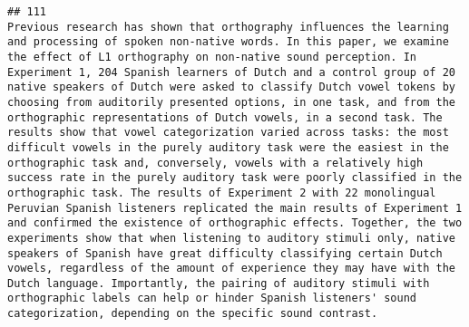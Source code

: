 \documentclass[
  english,
  man]{apa6}
\begin{document}
\begin{verbatim}
## 111                                                                                                                                                                                                                                                                                                                                                                                                                                                                                                                                                                                                                                                                                                                                                                                                                                                                                                                                                                                                                                                                                                                                                                                                                                                           Previous research has shown that orthography influences the learning and processing of spoken non-native words. In this paper, we examine the effect of L1 orthography on non-native sound perception. In Experiment 1, 204 Spanish learners of Dutch and a control group of 20 native speakers of Dutch were asked to classify Dutch vowel tokens by choosing from auditorily presented options, in one task, and from the orthographic representations of Dutch vowels, in a second task. The results show that vowel categorization varied across tasks: the most difficult vowels in the purely auditory task were the easiest in the orthographic task and, conversely, vowels with a relatively high success rate in the purely auditory task were poorly classified in the orthographic task. The results of Experiment 2 with 22 monolingual Peruvian Spanish listeners replicated the main results of Experiment 1 and confirmed the existence of orthographic effects. Together, the two experiments show that when listening to auditory stimuli only, native speakers of Spanish have great difficulty classifying certain Dutch vowels, regardless of the amount of experience they may have with the Dutch language. Importantly, the pairing of auditory stimuli with orthographic labels can help or hinder Spanish listeners' sound categorization, depending on the specific sound contrast.

\end{verbatim}
\end{document}
